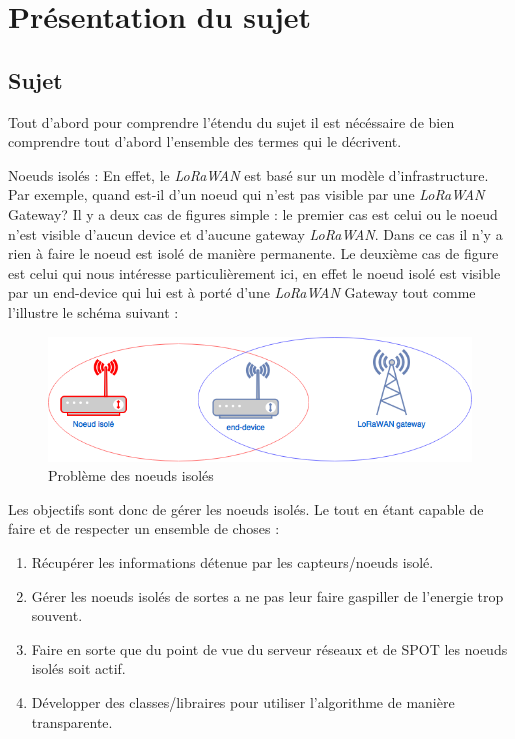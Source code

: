 \chapter{Présentation du sujet}
 
\section{Sujet}
 Tout d'abord pour comprendre l'étendu du sujet il est nécéssaire de bien comprendre tout d'abord l'ensemble des termes qui le décrivent. 

\begin{mydef}
 Noeuds isolés : En effet, le  \textit{LoRaWAN} est basé sur un modèle d'infrastructure. Par exemple, quand est-il d'un noeud qui n'est pas visible par une  \textit{LoRaWAN} Gateway? Il y a deux cas de figures simple : le premier cas est celui  ou le noeud n'est visible d'aucun device et d'aucune gateway  \textit{LoRaWAN}. Dans ce cas il n'y a rien à faire le noeud est isolé de manière permanente. Le deuxième cas de figure est celui qui nous intéresse particulièrement ici, en effet le noeud isolé est visible par un end-device qui lui est à porté d'une  \textit{LoRaWAN} Gateway tout comme l'illustre le schéma suivant :
 \begin{figure}[h!]
\centering
\includegraphics[scale=0.6]{probleme.png} 
\caption{Problème des noeuds isolés}
\end{figure}
\end{mydef}
 

Les objectifs sont donc de gérer les noeuds isolés. Le tout en étant capable de faire et de respecter un ensemble de choses : 
\begin{enumerate}
	\item Récupérer les informations détenue par les capteurs/noeuds isolé.
	\item Gérer les noeuds isolés de sortes a ne pas leur faire gaspiller de l'energie trop souvent.
	\item Faire en sorte que du point de vue du serveur réseaux et de SPOT les noeuds isolés soit actif.
	\item Développer des classes/libraires pour utiliser l'algorithme de manière transparente.
\end{enumerate}

